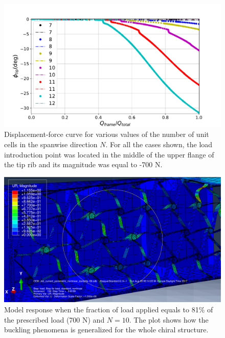     \begin{figure}[!htpb] %
      \centering
      \includegraphics[width=0.8 \textwidth]{figures/../figures/result-sim/N/force_displacement-far}
      \caption[Displacement-force curve for various values of the number of unit cells in the spanwise direction]{Displacement-force curve for various values of the number of unit cells in the spanwise direction $N$. For all the cases shown, the load introduction point was located in the middle of the upper flange of the tip rib and its magnitude was equal to -700 N.}\label{fig:forceDisplacement-far-N}
    \end{figure}

    \begin{figure}[!htpb] %
      \centering
      \includegraphics[width=0.8 \textwidth]{figures/../figures/result-sim/N/10}
      \caption[Model response when the fraction of load applied equals to 81\% of the prescribed load (700 N) and $N = 10$]{Model response when the fraction of load applied equals to 81\% of the prescribed load (700 N) and $N = 10$. The plot shows how the buckling phenomena is generalized for the whole chiral structure.}\label{fig:N10-UR}
    \end{figure}

